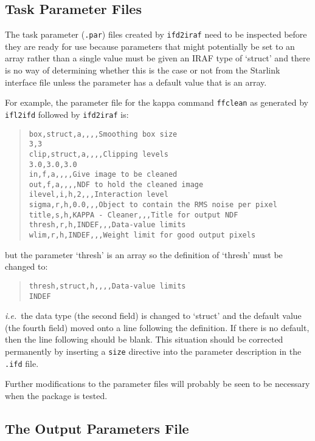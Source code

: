 \documentclass[twoside,11pt]{article}
\newcommand{\xref}[3]{#1}
\newcommand{\xlabel}[1]{}
\begin{document}
\subsection{\xlabel{task_parameter_files}\label{parfiles}Task Parameter Files}
The task parameter (\texttt{.par}) files created by
\xref{\texttt{ifd2iraf}}{ssn68}{producing_iraf_files_from_an_ifd}
need to be
inspected before they are ready for use because parameters that might
potentially be set to an array rather than a single value must be given
an IRAF type of `struct' and there is no way of determining whether this
is the case or not from the Starlink interface file unless the parameter has
a default value that is an array.

For example, the parameter file for the kappa command \texttt{ffclean} as
generated by
\xref{\texttt{ifl2ifd}}{ssn68}{creating_ifds_from_interface_files}
followed by
\xref{\texttt{ifd2iraf}}{ssn68}{producing_iraf_files_from_an_ifd}
is:
\begin{quote} \begin{verbatim}
box,struct,a,,,,Smoothing box size
3,3
clip,struct,a,,,,Clipping levels
3.0,3.0,3.0
in,f,a,,,,Give image to be cleaned
out,f,a,,,,NDF to hold the cleaned image
ilevel,i,h,2,,,Interaction level
sigma,r,h,0.0,,,Object to contain the RMS noise per pixel
title,s,h,KAPPA - Cleaner,,,Title for output NDF
thresh,r,h,INDEF,,,Data-value limits
wlim,r,h,INDEF,,,Weight limit for good output pixels
\end{verbatim} \end{quote}
but the parameter `thresh' is an array so the definition of `thresh'
must be changed to:
\begin{quote} \begin{verbatim}
thresh,struct,h,,,,Data-value limits
INDEF
\end{verbatim} \end{quote}
\textit{i.e.}\ the data type (the second field) is changed to `struct' and the
default value (the fourth field) moved onto a line following the definition.
If there is no default, then the line following should be blank.
This situation should be corrected permanently by inserting a
\xref{\texttt{size}}{ssn68}{size} directive into the parameter description in
the \texttt{.ifd} file.

Further modifications to the parameter files will probably be seen to be
necessary when the package is tested.

\subsection{\xlabel{the_output_parameters_file}The Output Parameters File}
\end{document}
